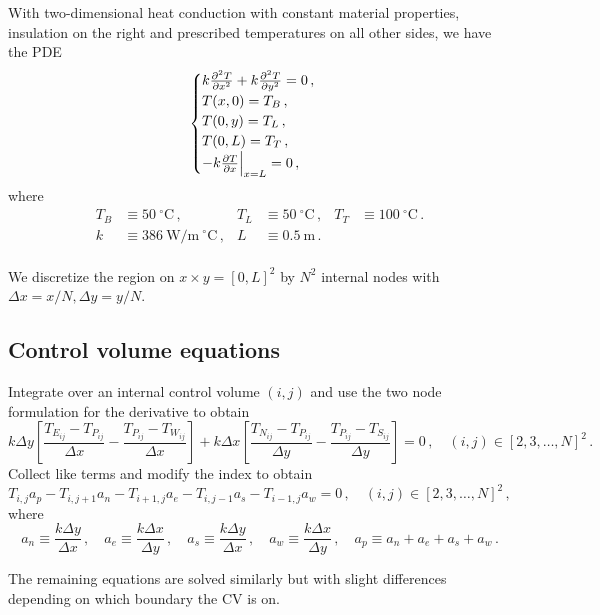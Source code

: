 \documentclass{article}
\begin{document}
With two-dimensional heat conduction with constant material properties, insulation on the right and prescribed temperatures on all other sides, we have the PDE
\begin{equation}
	\begin{cases}
		k \pdv{^2T}{x^2} + k \pdv{^2T}{y^2} = 0\,,\\
		T(x, 0) = T_B\,,\\
		T(0, y) = T_L\,,\\
		T(0, L) = T_T\,,\\
		-k \pdv{T}{x} \Big|_{x = L} = 0\,,
	\end{cases}
\end{equation}
where
\begin{align*}
	T_B & \equiv 50~^\circ\text{C}\,, & T_L & \equiv 50~^\circ\text{C}\,, & T_T & \equiv 100~^\circ\text{C}\,.\\
	k & \equiv 386~\text{W/m}~^\circ\text{C}\,, & L & \equiv 0.5~\text{m}\,.\\
\end{align*}

We discretize the region on $x \times y = [0, L]^2$ by $N^2$ internal nodes with $\Delta x = x / N, \Delta y = y / N$.

\subsection*{Control volume equations}

Integrate over an internal control volume $(i,j)$ and use the two node formulation for the derivative to obtain
\[
	k \Delta y \left[\frac{T_{E_{ij}} - T_{P_{ij}}}{\Delta x} - \frac{T_{P_{ij}} - T_{W_{ij}}}{\Delta x}\right] + k \Delta x \left[ \frac{T_{N_{ij}} - T_{P_{ij}}}{\Delta y} -\frac{T_{P_{ij}} - T_{S_{ij}}}{\Delta y} \right] = 0\,, \quad (i, j) \in [2, 3, \ldots, N]^2\,.
\]
Collect like terms and modify the index to obtain
\begin{equation}
	\label{eq:internal}
	T_{i,j} a_p - T_{i, j+1} a_n - T_{i+1, j} a_e - T_{i, j-1} a_s - T_{i-1, j} a_w = 0\,,\quad (i, j) \in [2, 3, \ldots, N]^2\,,
\end{equation}
where
\[
	a_n \equiv \frac{k \Delta y}{\Delta x}\,, \quad a_e \equiv \frac{k \Delta x}{\Delta y}\,, \quad a_s \equiv \frac{k\Delta y}{\Delta x}\,, \quad a_w \equiv \frac{k\Delta x}{\Delta y}\,, \quad a_p \equiv a_n + a_e + a_s + a_w\,.
\]

The remaining equations are solved similarly but with slight differences depending on which boundary the CV is on.
\end{document}
